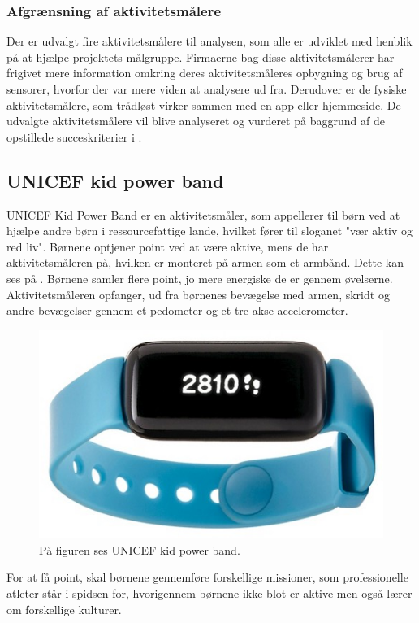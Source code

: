 \subsubsection{Afgrænsning af aktivitetsmålere}  %
Der er udvalgt fire aktivitetsmålere til analysen, som alle er udviklet med henblik på at hjælpe projektets målgruppe. Firmaerne bag disse aktivitetsmålerer har frigivet mere information omkring deres aktivitetsmåleres opbygning og brug af sensorer, hvorfor der var mere viden at analysere ud fra. Derudover er de fysiske aktivitetsmålere, som trådløst virker sammen med en app eller hjemmeside. De udvalgte aktivitetsmålere vil blive analyseret og vurderet på baggrund af de opstillede succeskriterier i .

\subsection{UNICEF kid power band}
UNICEF Kid Power Band er en aktivitetsmåler, som appellerer til børn ved at hjælpe andre børn i ressourcefattige lande, hvilket fører til sloganet "vær aktiv og red liv". Børnene optjener point ved at være aktive, mens de har aktivitetsmåleren på, hvilken er monteret på armen som et armbånd. Dette kan ses på . Børnene samler flere point, jo mere energiske de er gennem øvelserne.
Aktivitetsmåleren opfanger, ud fra børnenes bevægelse med armen, skridt og andre bevægelser gennem et pedometer og et tre-akse accelerometer. \citep{PowerAbout2015,PowerManual2015}
\begin{figure}[H]
	\centering
	\includegraphics[scale=0.6]{figures/aProblemanalyse/unicef.png}
	\caption{På figuren ses UNICEF kid power band. \cite{Unicef2016}}
	\label{fig:unicef}
\end{figure}
For at få point, skal børnene gennemføre forskellige missioner, som professionelle atleter står i spidsen for, hvorigennem børnene ikke blot er aktive men også lærer om forskellige kulturer. \citep{PowerMission2015} 
